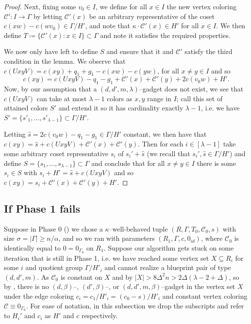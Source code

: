 \documentclass{article}
\newcommand{\cC}{\mathcal{C} }
\theoremstyle{definition}
\begin{document}
\begin{proof}
Next, fixing some $v_0\in I$, we define for all $x\in I$ the new vertex coloring $\cC':I\to\Gamma$ by letting $\cC'(x)$ be an arbitrary representative of the coset $c(xw)-c(wv_0)\in \Gamma/H'$, and note that $\kappa \cdot \cC'(x)\in H'$ for all $x\in I$. We then define $T\coloneqq \{\cC'(x):x\in I\}\subset \Gamma$ and note it satisfies the required properties.

We now only have left to define $S$ and ensure that it and $\cC'$ satisfy the third condition in the lemma. We observe that $c(UxyV)=c(xy)+q_1+g_1-c(xw)-c(yw)$, for all $x\neq y\in I$ and so
\[c(xy)=c(UxyV) -q_1-g_1+\cC'(x)+\cC'(y)+2c(v_0w)+H'.\] 
Now, by our assumption that a $(d,d',m,\lambda)$--gadget does not exist, we see that $c(UxyV)$ can take at most $\lambda-1$ colors as $x, y$ range in $I$; call this set of attained colors $S'$ and extend it so it has cardinality exactly $\lambda-1$, i.e. we have $S'=\{s'_1, \dots, s'_{\lambda-1}\}\subset \Gamma/H'$.

Letting $\hat{s}= 2c(v_0w)-q_1-g_1\in \Gamma/H'$ constant, we then have that $c(xy)=\hat{s}+c(UxyV)+\cC'(x)+\cC'(y)$. Then for each $i\in [\lambda-1]$ take some arbitrary coset representative $s_i$ of $s_i' + \hat{s}$ (we recall that $s_i', \hat{s}\in \Gamma/H'$) and define $S=\{s_1,\ldots,s_{\lambda-1}\}\subset \Gamma$ and conclude that for all $x\neq y\in I$ there is some $s_i\in S$ with $s_i+H'=\hat{s}+c(UxyV)$ and so  $c(xy)=s_i+\cC'(x)+\cC'(y)+H'$.
\end{proof}

\subsection{If Phase 1 fails}\label{phase_1}

Suppose in Phase 0 () we chose a $\kappa$--well-behaved tuple $(R,\Gamma,T_0,\cC_0,s)$ with size $\sigma=|\Gamma|\geq n/\alpha$, and so we ran  with parameters $(R_1,\Gamma,c,0_{id})$, where $\cC_0$ is identically equal to $0=0_{\Gamma_0}$ on $R_1$. Suppose our algorithm gets stuck on some iteration that is still in Phase 1, i.e. we have reached some vertex set $X\subseteq R_i$ for some $i$ and quotient group $\Gamma/H'_i$ and cannot realize a blueprint pair of type $(d,d',m)$. As $\cC_0$ is constant on $X$ and by  $|X|>8\Delta^2n>2\Delta(\lambda-2+\Delta)$, so by , there is no $(d,\beta)$--, $(d',\beta)$--, or $(d,d',m,\beta)$--gadget in the vertex set $X$ under the edge coloring $c_i= c_1/H'_i=(c_0-s)/H'_i$ and constant vertex coloring $\cC\equiv 0_{\Gamma_0}$. For ease of notation, in this subsection we drop the subscripts and refer to $H_i'$ and $c_i$ as $H'$ and $c$ respectively.
\end{document}
